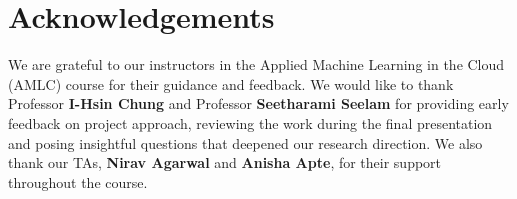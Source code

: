 \documentclass[10pt,twocolumn]{article}
\begin{document}
\section*{Acknowledgements}
\label{sec:ack}

We are grateful to our instructors in the Applied Machine Learning in the Cloud
(AMLC) course for their guidance and feedback. We would like to thank Professor \textbf{I-Hsin Chung} and Professor \textbf{Seetharami Seelam}
for providing
early feedback on project approach, reviewing the work during the final presentation and posing insightful questions that deepened our research direction. We also thank our TAs, \textbf{Nirav
Agarwal} and \textbf{Anisha Apte}, for their support throughout the course.
\end{document}

